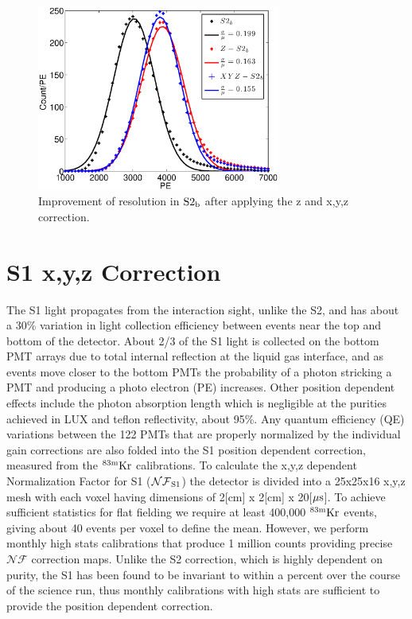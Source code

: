 \begin{figure}[h!]\centering
\includegraphics[width=80mm]{Chapter_XYZ_Corr/Thesis_Corr_Plots/S2_corr_res.eps}
\caption{Improvement of resolution in $\rm S2_b$ after applying the z and x,y,z correction. }
\label{fig:S2_res}
\end{figure}



\section{S1 x,y,z Correction}

The S1 light propagates from the interaction sight, unlike the S2, and has about a 30\% variation in light collection efficiency between events near the top and bottom of the detector. About 2/3 of the S1 light is collected on the bottom PMT arrays due to total internal reflection at the liquid gas interface, and as events move closer to the bottom PMTs the probability of a photon stricking a PMT and producing a photo electron (PE) increases. Other position dependent effects include the photon absorption length which is negligible at the purities achieved in LUX and teflon reflectivity, about 95\%. Any quantum efficiency (QE) variations between the 122 PMTs that are properly normalized by the individual gain corrections are also folded into the S1 position dependent correction, measured from the $\rm^{83m}Kr$ calibrations.
To calculate the x,y,z dependent Normalization Factor for S1 ($\rm \mathcal{NF}_{S1}$) the detector is divided into a 25x25x16 x,y,z mesh with each voxel having dimensions of 2[cm] x 2[cm] x 20[$\rm \mu s$]. To achieve sufficient statistics for flat fielding we require at least 400,000 $\rm^{83m}Kr$ events, giving about 40 events per voxel to define the mean. However, we perform monthly high stats calibrations that produce 1 million counts providing precise $\mathcal{NF}$ correction maps. Unlike the S2 correction, which is highly dependent on purity, the S1 has been found to be invariant to within a percent over the course of the science run, thus monthly calibrations with high stats are sufficient to provide the position dependent correction.

